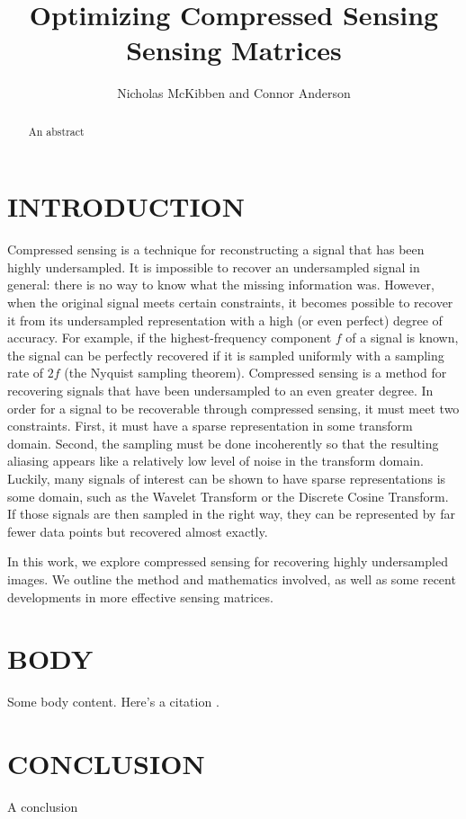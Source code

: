 \documentclass[journal]{IEEEtran}
\title{Optimizing Compressed Sensing Sensing Matrices}
\author{Nicholas McKibben and Connor Anderson}
\begin{document}
\maketitle
\thispagestyle{empty}
\pagestyle{empty}
\begin{abstract}

An abstract

\end{abstract}
\section{INTRODUCTION}

Compressed sensing is a technique for reconstructing a signal that has been
highly undersampled. It is impossible to recover an undersampled signal in 
general: there is no way to know what the missing information was. However, when
the original signal meets certain constraints, it becomes possible to recover it
from its undersampled representation with a high (or even perfect) degree of
accuracy. For example, if the highest-frequency component $f$ of a signal is
known, the signal can be perfectly recovered if it is sampled uniformly with a 
sampling rate of $2f$ (the Nyquist sampling theorem). Compressed sensing is a
method for recovering signals that have been undersampled to an even greater
degree. In order for a signal to be recoverable through compressed sensing, it
must meet two constraints. First, it must have a sparse representation in some
transform domain. Second, the sampling must be done incoherently so that the
resulting aliasing appears like a relatively low level of noise in the transform
domain. Luckily, many signals of interest can be shown to have sparse
representations is some domain, such as the Wavelet Transform or the Discrete
Cosine Transform. If those signals are then sampled in the right way, they can
be represented by far fewer data points but recovered almost exactly.

In this work, we explore compressed sensing for recovering highly undersampled
images. We outline the method and mathematics involved, as well as some recent
developments in more effective sensing matrices.

\section{BODY}

Some body content. Here's a citation \cite{example}.

\section{CONCLUSION}

A conclusion



{}
\end{document}
